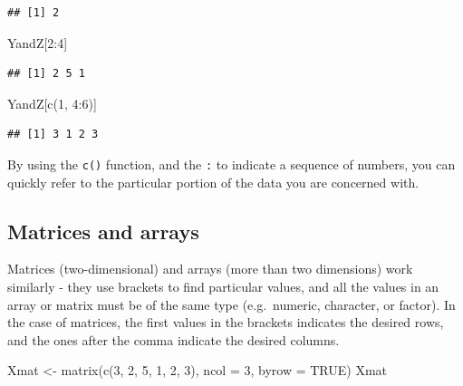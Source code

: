 \documentclass[
]{book}
\newenvironment{Shaded}{\begin{snugshade}}{\end{snugshade}}
\newcommand{\AttributeTok}[1]{\textcolor[rgb]{0.77,0.63,0.00}{#1}}
\newcommand{\ConstantTok}[1]{\textcolor[rgb]{0.00,0.00,0.00}{#1}}
\newcommand{\DecValTok}[1]{\textcolor[rgb]{0.00,0.00,0.81}{#1}}
\newcommand{\FunctionTok}[1]{\textcolor[rgb]{0.00,0.00,0.00}{#1}}
\newcommand{\NormalTok}[1]{#1}
\newcommand{\OtherTok}[1]{\textcolor[rgb]{0.56,0.35,0.01}{#1}}
\newcommand{\SpecialCharTok}[1]{\textcolor[rgb]{0.00,0.00,0.00}{#1}}
\begin{document}
\begin{verbatim}
## [1] 2
\end{verbatim}

\begin{Shaded}
\begin{Highlighting}[]
\NormalTok{YandZ[}\DecValTok{2}\SpecialCharTok{:}\DecValTok{4}\NormalTok{]}
\end{Highlighting}
\end{Shaded}

\begin{verbatim}
## [1] 2 5 1
\end{verbatim}

\begin{Shaded}
\begin{Highlighting}[]
\NormalTok{YandZ[}\FunctionTok{c}\NormalTok{(}\DecValTok{1}\NormalTok{, }\DecValTok{4}\SpecialCharTok{:}\DecValTok{6}\NormalTok{)]}
\end{Highlighting}
\end{Shaded}

\begin{verbatim}
## [1] 3 1 2 3
\end{verbatim}

By using the \texttt{c()} function, and the \texttt{:} to indicate a sequence of numbers, you can quickly refer to the particular portion of the data you are concerned with.

\hypertarget{matrices-and-arrays}{%
\subsection*{Matrices and arrays}\label{matrices-and-arrays}}

Matrices (two-dimensional) and arrays (more than two dimensions) work similarly - they use brackets to find particular values, and all the values in an array or matrix must be of the same type (e.g.~numeric, character, or factor). In the case of matrices, the first values in the brackets indicates the desired rows, and the ones after the comma indicate the desired columns.

\begin{Shaded}
\begin{Highlighting}[]
\NormalTok{Xmat }\OtherTok{\textless{}{-}} \FunctionTok{matrix}\NormalTok{(}\FunctionTok{c}\NormalTok{(}\DecValTok{3}\NormalTok{, }\DecValTok{2}\NormalTok{, }\DecValTok{5}\NormalTok{, }\DecValTok{1}\NormalTok{, }\DecValTok{2}\NormalTok{, }\DecValTok{3}\NormalTok{), }
               \AttributeTok{ncol =} \DecValTok{3}\NormalTok{, }\AttributeTok{byrow =} \ConstantTok{TRUE}\NormalTok{)}
\NormalTok{Xmat}
\end{Highlighting}
\end{Shaded}
\end{document}
